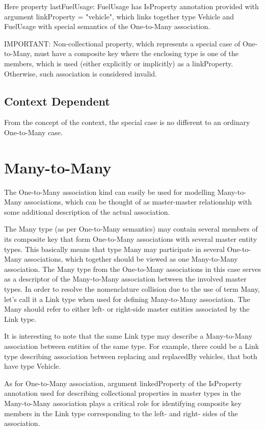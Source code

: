   Here property lastFuelUsage: FuelUsage has IsProperty annotation provided with argument linkProperty = "vehicle", which links together type Vehicle and FuelUsage with special semantics of the One-to-Many association.

  IMPORTANT: Non-collectional property, which represents a special case of One-to-Many, must have a composite key where the enclosing type is one of the members, which is used (either explicitly or implicitly) as a linkProperty. Otherwise, such association is considered invalid.

  \subsection{Context Dependent}

  From the concept of the context, the special case is no different to an ordinary One-to-Many case.

\section{Many-to-Many}

  The One-to-Many association kind can easily be used for modelling Many-to-Many associations, which can be thought of as master-master relationship with some additional description of the actual association.

  The Many type (as per One-to-Many semantics) may contain several members of its composite key that form One-to-Many associations with several master entity types. This basically means that type Many may participate in several One-to-Many associations, which together should be viewed as one Many-to-Many association. The Many type from the One-to-Many associations in this case serves as a descriptor of the Many-to-Many association between the involved master types. In order to resolve the nomenclature collision due to the use of term Many, let's call it a Link type when used for defining Many-to-Many association. The Many should refer to either left- or right-side master entities associated by the Link type.

  It is interesting to note that the same Link type may describe a Many-to-Many association between entities of the same type. For example, there could be a Link type describing association between replacing and replacedBy vehicles, that both have type Vehicle.

  As for One-to-Many association, argument linkedProperty of the IsProperty annotation used for describing collectional properties in master types in the Many-to-Many association plays a critical role for identifying composite key members in the Link type corresponding to the left- and right- sides of the association.


